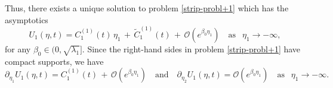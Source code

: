 \documentclass[reqno]{amsart}            %
\numberwithin{equation}{section}
\begin{document}
	Thus, there exists a unique solution to problem \eqref{strip-probl+1} which has the asymptotics
	\begin{equation*}
		U_1(\eta,t) = C_1^{(1)}(t)\, \eta_1 \, + \, \widetilde{C}^{(1)}_1(t)\, + \, \mathcal{O}\!\left(e^{\beta_0 \eta_1}\right)
		\quad \text{as } \ \ \eta_1 \to -\infty,
	\end{equation*}  
	for any $\beta_0 \in (0,\sqrt{\lambda_1}]$.
	Since the right-hand sides in problem \eqref{strip-probl+1} have compact supports, we have 
	\begin{equation}\label{asymptotic-derin-origin}
		\partial_{\eta_1} U_1(\eta,t) = C_1^{(1)}(t) \, + \, \mathcal{O}\!\left(e^{\beta_0 \eta_1}\right) \quad \text{and} \quad 
		\partial_{\eta_2} U_1(\eta,t) =  \mathcal{O}\!\left(e^{\beta_0 \eta_1}\right)
		\quad \text{as } \ \ \eta_1 \to -\infty.	
	\end{equation}
	
\end{document}
